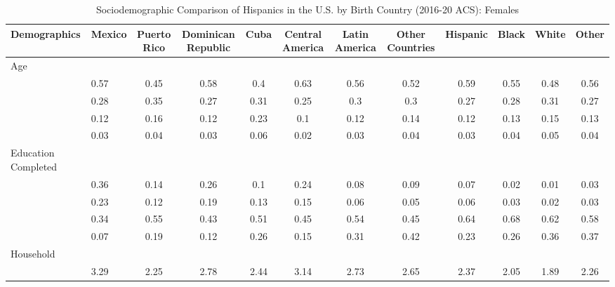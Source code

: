\begin{table}[ht]
\centering
\caption{Sociodemographic Comparison of Hispanics in the U.S. by Birth Country (2016-20 ACS): Females} 
\begingroup\small
\begin{tabular}{>{\raggedright\arraybackslash}p{3.2cm}|lcccccc|cccc}
  \hline
Demographics & Mexico & Puerto Rico & Dominican Republic & Cuba & Central America & Latin America & Other Countries & Hispanic & Black & White & Other \\ 
  \hline
Age &  &  &  &  &  &  &  &  &  &  &  \\ 
  \multicolumn{1}{>{\raggedleft\arraybackslash}p{1.5cm}|}{\makebox[1.5cm][r]{60 - 69 }}& 0.57 & 0.45 & 0.58 & 0.4 & 0.63 & 0.56 & 0.52 & 0.59 & 0.55 & 0.48 & 0.56 \\ 
  \multicolumn{1}{>{\raggedleft\arraybackslash}p{1.5cm}|}{\makebox[1.5cm][r]{70 - 79 }}& 0.28 & 0.35 & 0.27 & 0.31 & 0.25 & 0.3 & 0.3 & 0.27 & 0.28 & 0.31 & 0.27 \\ 
  \multicolumn{1}{>{\raggedleft\arraybackslash}p{1.5cm}|}{\makebox[1.5cm][r]{80 - 89 }}& 0.12 & 0.16 & 0.12 & 0.23 & 0.1 & 0.12 & 0.14 & 0.12 & 0.13 & 0.15 & 0.13 \\ 
  \multicolumn{1}{>{\raggedleft\arraybackslash}p{1.5cm}|}{\makebox[1.5cm][r]{90 plus }}& 0.03 & 0.04 & 0.03 & 0.06 & 0.02 & 0.03 & 0.04 & 0.03 & 0.04 & 0.05 & 0.04 \\ 
  Education Completed &  &  &  &  &  &  &  &  &  &  &  \\ 
  \multicolumn{1}{>{\raggedleft\arraybackslash}p{3.2cm}|}{\makebox[3.2cm][r]{Less than Primary }}& 0.36 & 0.14 & 0.26 & 0.1 & 0.24 & 0.08 & 0.09 & 0.07 & 0.02 & 0.01 & 0.03 \\ 
  \multicolumn{1}{>{\raggedleft\arraybackslash}p{1.7cm}|}{\makebox[1.7cm][r]{Primary }}& 0.23 & 0.12 & 0.19 & 0.13 & 0.15 & 0.06 & 0.05 & 0.06 & 0.03 & 0.02 & 0.03 \\ 
  \multicolumn{1}{>{\raggedleft\arraybackslash}p{2cm}|}{\makebox[2cm][r]{Secondary }}& 0.34 & 0.55 & 0.43 & 0.51 & 0.45 & 0.54 & 0.45 & 0.64 & 0.68 & 0.62 & 0.58 \\ 
  \multicolumn{1}{>{\raggedleft\arraybackslash}p{2cm}|}{\makebox[2cm][r]{University }}& 0.07 & 0.19 & 0.12 & 0.26 & 0.15 & 0.31 & 0.42 & 0.23 & 0.26 & 0.36 & 0.37 \\ 
  Household &  &  &  &  &  &  &  &  &  &  &  \\ 
  \multicolumn{1}{>{\raggedleft\arraybackslash}p{2.7cm}|}{\makebox[2.7cm][r]{Household Size }}& 3.29 & 2.25 & 2.78 & 2.44 & 3.14 & 2.73 & 2.65 & 2.37 & 2.05 & 1.89 & 2.26 \\ 

\end{tabular}
\end{table}
